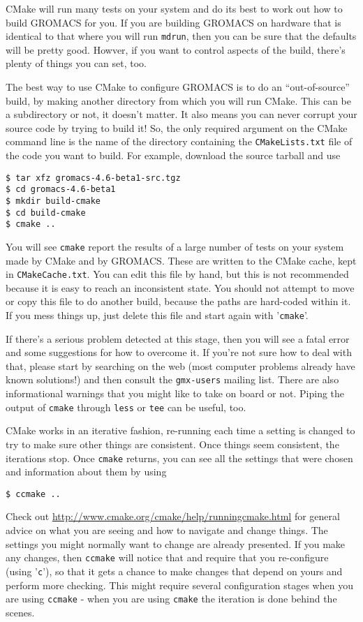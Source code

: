\documentclass{article}[12pt,a4paper,twoside]
\newcommand{\gromacs}{GROMACS}
\newcommand{\cmake}{CMake}
\begin{document}
\cmake{} will run many tests on your system and do its best to work
out how to build \gromacs{} for you. If you are building \gromacs{} on
hardware that is identical to that where you will run \texttt{mdrun},
then you can be sure that the defaults will be pretty good. Howver, if
you want to control aspects of the build, there's plenty of things you
can set, too.

The best way to use \cmake{} to configure \gromacs{} is to do an
``out-of-source'' build, by making another directory from which you
will run \cmake{}. This can be a subdirectory or not, it doesn't
matter. It also means you can never corrupt your source code by trying
to build it! So, the only required argument on the \cmake{} command
line is the name of the directory containing the
\texttt{CMakeLists.txt} file of the code you want to build. For
example, download the source tarball and use
\begin{verbatim}
$ tar xfz gromacs-4.6-beta1-src.tgz
$ cd gromacs-4.6-beta1
$ mkdir build-cmake
$ cd build-cmake
$ cmake ..
\end{verbatim}

You will see \texttt{cmake} report the results of a large number of
tests on your system made by \cmake{} and by \gromacs{}. These are
written to the \cmake{} cache, kept in \texttt{CMakeCache.txt}. You
can edit this file by hand, but this is not recommended because it is
easy to reach an inconsistent state. You should not attempt to move or
copy this file to do another build, because the paths are hard-coded
within it. If you mess things up, just delete this file and start
again with '\verb+cmake+'.

If there's a serious problem detected at this stage, then you will see
a fatal error and some suggestions for how to overcome it. If you're
not sure how to deal with that, please start by searching on the web
(most computer problems already have known solutions!) and then
consult the \texttt{gmx-users} mailing list. There are also
informational warnings that you might like to take on board or
not. Piping the output of \texttt{cmake} through \texttt{less} or
\texttt{tee} can be useful, too.

\cmake{} works in an iterative fashion, re-running each time a setting
is changed to try to make sure other things are consistent. Once
things seem consistent, the iterations stop. Once \texttt{cmake}
returns, you can see all the settings that were chosen and information
about them by using 
\begin{verbatim}
$ ccmake ..
\end{verbatim}
Check out \url{http://www.cmake.org/cmake/help/runningcmake.html} for
general advice on what you are seeing and how to navigate and change
things. The settings you might normally want to change are already
presented. If you make any changes, then \texttt{ccmake} will notice
that and require that you re-configure (using '\verb+c+'), so that it
gets a chance to make changes that depend on yours and perform more
checking. This might require several configuration stages when you are
using \texttt{ccmake} - when you are using \texttt{cmake} the
iteration is done behind the scenes.
\end{document}
